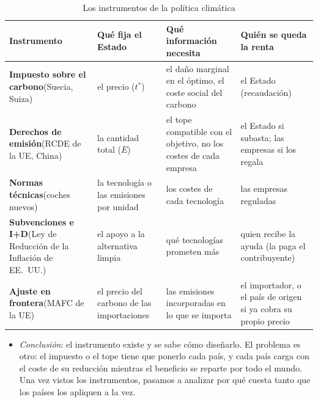 \documentclass[11pt]{article}
\begin{document}
\begin{table}[H]
\centering
\caption{Los instrumentos de la política climática}\label{tab:instrumentos-clima}
\small
\begin{tabular}{>{\raggedright\arraybackslash}m{3.3cm}>{\raggedright\arraybackslash}m{3.0cm}>{\raggedright\arraybackslash}m{4.4cm}>{\raggedright\arraybackslash}m{3.9cm}}
\toprule
\rowcolor{tceeazulpalido}\textbf{Instrumento} & \textbf{Qué fija el Estado} & \textbf{Qué información necesita} & \textbf{Quién se queda la renta}\\
\midrule
\textcolor{tceemorado}{\textbf{Impuesto sobre el carbono}}\newline (Suecia, Suiza) & el precio ($t^*$) & el daño marginal en el óptimo, el coste social del carbono & el Estado (recaudación)\\
\addlinespace[0.3em]
\textcolor{tceemorado}{\textbf{Derechos de emisión}}\newline (RCDE de la UE, China) & la cantidad total ($\overline{E}$) & el tope compatible con el objetivo, no los costes de cada empresa & el Estado si subasta; las empresas si los regala\\
\addlinespace[0.3em]
\textcolor{tceemorado}{\textbf{Normas técnicas}}\newline (coches nuevos) & la tecnología o las emisiones por unidad & los costes de cada tecnología & las empresas reguladas\\
\addlinespace[0.3em]
\textcolor{tceemorado}{\textbf{Subvenciones e I+D}}\newline (Ley de Reducción de la Inflación de EE.~UU.) & el apoyo a la alternativa limpia & qué tecnologías prometen más & quien recibe la ayuda (la paga el contribuyente)\\
\addlinespace[0.3em]
\textcolor{tceemorado}{\textbf{Ajuste en frontera}}\newline (MAFC de la UE) & el precio del carbono de las importaciones & las emisiones incorporadas en lo que se importa & el importador, o el país de origen si ya cobra su propio precio\\
\bottomrule
\end{tabular}
\end{table}

\begin{itemize}
\item \emph{Conclusión}: el instrumento existe y se sabe cómo diseñarlo. El problema es otro: el impuesto o el tope tiene que ponerlo cada país, y cada país carga con el coste de su reducción mientras el beneficio se reparte por todo el mundo. Una vez vistos los instrumentos, pasamos a analizar por qué cuesta tanto que los países los apliquen a la vez.
\end{itemize}
\end{document}
